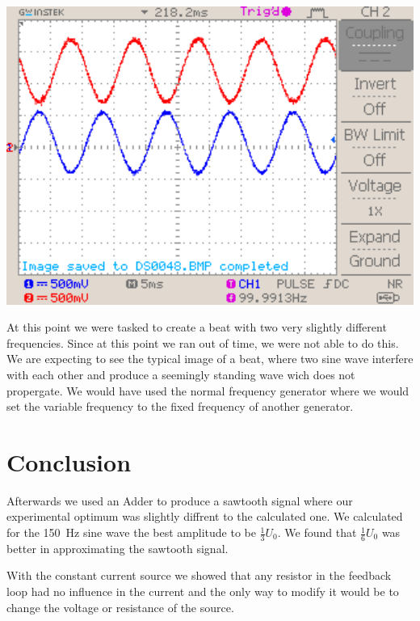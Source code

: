 \documentclass[a4paper,10pt]{article}
\newenvironment{Figure}
        {\par\medskip\noindent\minipage{\linewidth}}
        {\endminipage\par\medskip}
\numberwithin{equation}{section}
\begin{document}
\begin{multicols}{2}
\begin{Figure}
		\label{fig:damp2}
	\end{Figure}
	\begin{Figure}
		\centering
		\includegraphics[width=1\textwidth]{../data/DS0049_n.png}
		\label{fig:damp3}
	\end{Figure}

	At this point we were tasked to create a beat with two very slightly different frequencies. Since at this point we ran out of time, we were not able to do this. We are expecting to see the typical image of a beat, where two sine wave interfere with each other and produce a seemingly standing wave wich does not propergate. We would have used the normal frequency generator where we would set the variable frequency to the fixed frequency of another generator.
	\section{Conclusion}


	Afterwards we used an Adder to produce a sawtooth signal where our experimental optimum was slightly diffrent to the calculated one. We calculated for the \SI{150}{Hz} sine wave the best amplitude to be $\frac{1}{3}U_0$. We found that $\frac{1}{6}U_0$ was better in approximating the sawtooth signal.

	With the constant current source we showed that any resistor in the feedback loop had no influence in the current and the only way to modify it would be to change the voltage or resistance of the source.


\end{multicols}
\end{document}
